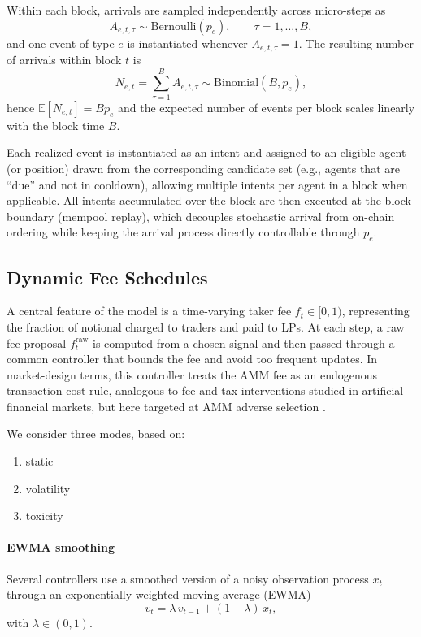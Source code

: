 \documentclass[11pt]{article}
\begin{document}
Within each block, arrivals are sampled independently across micro-steps as
\[
A_{e,t,\tau}\sim \text{Bernoulli}(p_e),\qquad \tau=1,\dots,B,
\]
and one event of type $e$ is instantiated whenever $A_{e,t,\tau}=1$. The resulting number of arrivals within block $t$ is
\[
N_{e,t}=\sum_{\tau=1}^B A_{e,t,\tau}\sim \text{Binomial}(B,p_e),
\]
hence $\mathbb{E}[N_{e,t}]=Bp_e$ and the expected number of events per block scales linearly with the block time $B$.

Each realized event is instantiated as an intent and assigned to an eligible agent (or position) drawn from the corresponding candidate set (e.g., agents that are “due” and not in cooldown), allowing multiple intents per agent in a block when applicable. All intents accumulated over the block are then executed at the block boundary (mempool replay), which decouples stochastic arrival from on-chain ordering while keeping the arrival process directly controllable through $p_e$.



\subsection{Dynamic Fee Schedules}
\label{subsec:fees}

A central feature of the model is a time-varying taker fee $f_t \in [0,1)$, representing the fraction of 
notional charged to traders and paid to LPs.
At each step, a raw fee proposal $f^{\mathrm{raw}}_t$ is computed from a chosen signal and then passed 
through a common controller that bounds the fee and avoid too frequent updates. In market-design terms, this controller treats the AMM fee as an endogenous transaction-cost rule, analogous 
to fee and tax interventions studied in artificial financial markets, but here targeted at AMM adverse 
selection \cite{westerhoff2006,mannaro2008,pellizzari2009,CARTEA2025105134}.

We consider three modes, based on:
\begin{enumerate}[label=\roman*), leftmargin=*]
  \item static
  \item volatility
  \item toxicity
\end{enumerate}

\paragraph{EWMA smoothing}
Several controllers use a smoothed version of a noisy observation process $x_t$ through an exponentially 
weighted moving average (EWMA)
\begin{equation}
  v_t = \lambda\, v_{t-1} + (1-\lambda)\, x_t,
  \label{eq:ewma}
\end{equation}
with $\lambda\in(0,1)$. 
\end{document}
